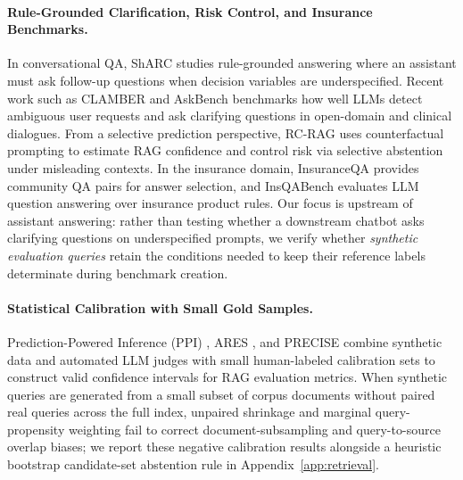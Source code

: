 \documentclass[10pt,twocolumn]{article}
\renewcommand{\_}{\textunderscore\allowbreak}
\begin{document}
\paragraph{Rule-Grounded Clarification, Risk Control, and Insurance Benchmarks.}
In conversational QA, ShARC \cite{saeidi2018sharc} studies rule-grounded answering where an assistant must ask follow-up questions when decision variables are underspecified. Recent work such as CLAMBER \cite{zhang2024clamber} and AskBench \cite{zhao2026askbench} benchmarks how well LLMs detect ambiguous user requests and ask clarifying questions in open-domain and clinical dialogues. From a selective prediction perspective, RC-RAG \cite{chen2024rcrag} uses counterfactual prompting to estimate RAG confidence and control risk via selective abstention under misleading contexts. In the insurance domain, InsuranceQA \cite{feng2015insuranceqa} provides community QA pairs for answer selection, and InsQABench \cite{ding2025insqabench} evaluates LLM question answering over insurance product rules. Our focus is upstream of assistant answering: rather than testing whether a downstream chatbot asks clarifying questions on underspecified prompts, we verify whether \emph{synthetic evaluation queries} retain the conditions needed to keep their reference labels determinate during benchmark creation.

\paragraph{Statistical Calibration with Small Gold Samples.}
Prediction-Powered Inference (PPI) \cite{angelopoulos2023prediction}, ARES \cite{saadfalcon2024ares}, and PRECISE \cite{divekar2026preciseaaai,divekar2026precise} combine synthetic data and automated LLM judges with small human-labeled calibration sets to construct valid confidence intervals for RAG evaluation metrics. When synthetic queries are generated from a small subset of corpus documents without paired real queries across the full index, unpaired shrinkage and marginal query-propensity weighting fail to correct document-subsampling and query-to-source overlap biases; we report these negative calibration results alongside a heuristic bootstrap candidate-set abstention rule in Appendix~\ref{app:retrieval}.
\end{document}
